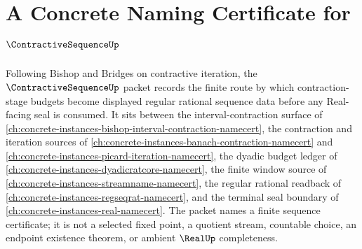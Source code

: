 \chapter{A Concrete Naming Certificate for $\ContractiveSequenceUp$}
\label{ch:concrete-instances-contractive-sequence-namecert}

Following Bishop and Bridges on contractive iteration, the $\ContractiveSequenceUp$ packet records the finite route by which contraction-stage budgets become displayed regular rational sequence data before any Real-facing seal is consumed. It sits between the interval-contraction surface of \autoref{ch:concrete-instances-bishop-interval-contraction-namecert}, the contraction and iteration sources of \autoref{ch:concrete-instances-banach-contraction-namecert} and \autoref{ch:concrete-instances-picard-iteration-namecert}, the dyadic budget ledger of \autoref{ch:concrete-instances-dyadicratcore-namecert}, the finite window source of \autoref{ch:concrete-instances-streamname-namecert}, the regular rational readback of \autoref{ch:concrete-instances-regseqrat-namecert}, and the terminal seal boundary of \autoref{ch:concrete-instances-real-namecert}. The packet names a finite sequence certificate; it is not a selected fixed point, a quotient stream, countable choice, an endpoint existence theorem, or ambient $\RealUp$ completeness.

